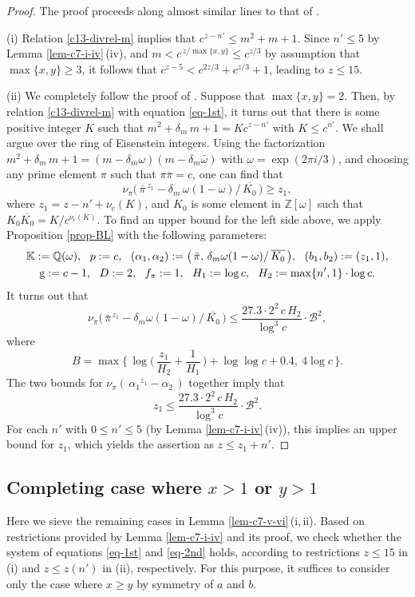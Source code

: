 \documentclass[11pt]{amsart}
\numberwithin{equation}{section}
\begin{document}
\begin{proof}
The proof proceeds along almost similar lines to that of \cite[Lemma 8.1\,(v)-(vi)]{MP3}.\par
(i) Relation \eqref{c13-divrel-m} implies that $c^{z-n'} \le m^2+m+1$.
Since $n' \le 5$ by Lemma \ref{lem-c7-i-iv}\,(iv), and $m<c^{\,z/\max\{x,y\}} \le c^{z/3}$ by assumption that $\max\{x,y\} \ge 3$, it follows that $c^{z-5}<c^{2z/3}+c^{z/3}+1$, leading to $z \le 15$.
\par 
(ii) We completely follow the proof of \cite[Lemma 8.1\,(vi)]{MP3}.
Suppose that $\max\{x,y\}=2$.
Then, by relation \eqref{c13-divrel-m} with equation \eqref{eq-1st}, it turns out that there is some positive integer $K$ such that $m^2+\delta_m\,m +1=K c^{z-n'}$ with $K \le c^{n'}$.
We shall argue over the ring of Eisenstein integers. 
Using the factorization $m^2+\delta_m\,m +1=(m-\delta_m \omega) (m-\delta_m \bar{\omega})$ with $\omega=\exp(2\pi i/3)$, and choosing any prime element $\pi$ such that $\pi \bar{\pi} =c$, one can find that
\[
\nu_{\pi} \bigr(\, {\bar{\pi}}^{\,z_1} - \delta_m\, \omega(1-\omega)/\,\overline{K_0} \,\big) \ge z_1,
\]
where $z_1=z-n'+\nu_c(K)$, and $K_0$ is some element in $\mathbb Z[\omega]$ such that $K_0\overline{K_0} =K/c^{\nu_{c}(K)}$.
To find an upper bound for the left side above, we apply Proposition \ref{prop-BL} with the following parameters:
\begin{gather*}
\mathbb K:=\mathbb Q(\omega), \ \ p:=c, \ \ (\alpha_1,\alpha_2):=\big(\,\bar{\pi},\,\delta_m \omega(1-\omega)/\,\overline{K_0}\,\bigr), \ \ (b_1,b_2):=(z_1,1),\\
{\rm g}:=c-1, \ \ D:=2, \ \ f_\pi:=1, \ \ H_1:=\log c, \ \ H_2:=\max\{n',1\} \cdot \log c.
\end{gather*}
It turns out that
\[
\nu_{\pi} \bigr(\, {\bar{\pi}}^{\,z_1} - \delta_m \omega(1-\omega)/\,\overline{K_0} \,\big) \le \frac{27.3 \cdot 2^2\,c\,H_2}{\log^3 c} \cdot \mathcal B^2,
\]
where
\[
B=\max\biggl\{\, \log \Big(\,\frac{z_1}{H_2}+\frac{1}{H_1}\,\Big)+\log \log c+0.4, \ 4\log c \,\biggl\}.
\]
The two bounds for $\nu_{\pi}(\,{\alpha_1}^{z_1} - \alpha_2\,)$ together imply that
\[
z_1 \le \frac{27.3 \cdot 2^2\,c\,H_2}{\log^3 c} \cdot \mathcal B^2.
\]
For each $n'$ with $0 \le n' \le 5$ (by Lemma \ref{lem-c7-i-iv}\,(iv)), this implies an upper bound for $z_1$, which yields the assertion as $z \le z_1+n'$.
\end{proof}

\subsection{Completing case where $x>1$ or $y>1$}\label{sec-6.2}
Here we sieve the remaining cases in Lemma \ref{lem-c7-v-vi}\,(i,\,ii). 
Based on restrictions provided by Lemma \ref{lem-c7-i-iv} and its proof, we check whether the system of equations \eqref{eq-1st} and \eqref{eq-2nd} holds, according to restrictions $z \le 15$ in (i) and $z \le z(n')$ in (ii), respectively.
For this purpose, it suffices to consider only the case where $x \ge y$ by symmetry of $a$ and $b$. 
\end{document}
